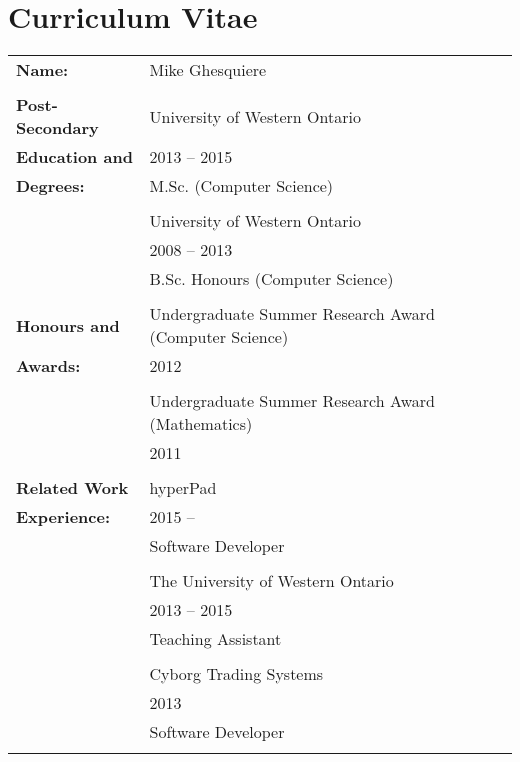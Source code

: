 \documentclass[12pt,twoside]{report}
\numberwithin{figure}{chapter}
\newcommand{\firstname}{Mike}
\newcommand{\lastname}{Ghesquiere}
\begin{document}
\chapter*{Curriculum Vitae}
\begin{table}[ht]
\begin{tabular}{ll}
\textbf{Name:} & \firstname{} \lastname\\\\
\textbf{Post-Secondary} 	& University of Western Ontario\\
\textbf{Education and}	& 2013 -- 2015 \\
\textbf{Degrees:}			& M.Sc. (Computer Science)\\
						\\
						& University of Western Ontario\\
						&  2008 -- 2013 \\
						& B.Sc. Honours (Computer Science)\\
						\\
\textbf{Honours and}		& Undergraduate Summer Research Award (Computer Science)\\
\textbf{Awards:}			& 2012\\
						\\
						& Undergraduate Summer Research Award (Mathematics) \\
						& 2011\\
						\\
\textbf{Related Work}		& hyperPad \\
\textbf{Experience:}		& 2015 -- \\
						& Software Developer \\
						\\
						& The University of Western Ontario\\
						& 2013 -- 2015 \\
						& Teaching Assistant \\
						\\
						& Cyborg Trading Systems \\
						& 2013  \\
						& Software Developer \\
						\\
\end{tabular}
\end{table}
\end{document}
